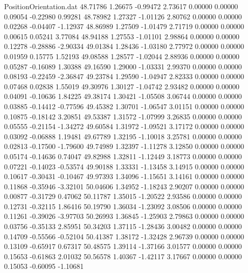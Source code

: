 \begin{filecontents}{PositionOrientation.dat}
  48.71786    1.26675   -0.99472     2.73617    0.00000    0.00000    0.09054   -0.22980    0.99281
  48.78982    1.27327   -1.01126     2.80762    0.00000    0.00000    0.02268   -0.04407   -1.12937
  48.86989    1.27509   -1.01479     2.71719    0.00000    0.00000    0.00615    0.05241    3.77084
  48.94188    1.27553   -1.01101     2.98864    0.00000    0.00000    0.12278   -0.28886   -2.90334
  49.01384    1.28436   -1.03180     2.77972    0.00000    0.00000    0.01959    0.15775    1.52193
  49.08588    1.28577   -1.02044     2.88936    0.00000    0.00000    0.05287   -0.16089    1.30388
  49.16590    1.29000   -1.03331     2.99370    0.00000    0.00000    0.08193   -0.22459   -2.36847
  49.23784    1.29590   -1.04947     2.82333    0.00000    0.00000    0.07468    0.02838    1.55019
  49.30976    1.30127   -1.04742     2.93482    0.00000    0.00000    0.04091   -0.10636    1.84225
  49.38174    1.30421   -1.05508     3.06744    0.00000    0.00000    0.03885   -0.14412   -0.77596
  49.45382    1.30701   -1.06547     3.01151    0.00000    0.00000    0.10875   -0.18142    3.20851
  49.53387    1.31572   -1.07999     3.26835    0.00000    0.00000    0.05555   -0.21154   -1.34272
  49.60584    1.31972   -1.09521     3.17172    0.00000    0.00000    0.03092   -0.06888    1.19481
  49.67789    1.32195   -1.10018     3.25781    0.00000    0.00000    0.02813   -0.17500   -1.79600
  49.74989    1.32397   -1.11278     3.12850    0.00000    0.00000    0.05174   -0.14636    0.74047
  49.82988    1.32811   -1.12449     3.18773    0.00000    0.00000    0.07221   -0.14023   -0.53574
  49.90188    1.33331   -1.13458     3.14915    0.00000    0.00000    0.10617   -0.30431   -0.10467
  49.97393    1.34096   -1.15651     3.14161    0.00000    0.00000    0.11868   -0.35946   -3.32101
  50.04606    1.34952   -1.18243     2.90207    0.00000    0.00000    0.00877   -0.31729    0.47062
  50.11787    1.35015   -1.20522     2.93586    0.00000    0.00000    0.12731   -0.32115    1.86416
  50.19790    1.36034   -1.23092     3.08506    0.00000    0.00000    0.11261   -0.39026   -3.97703
  50.26993    1.36845   -1.25903     2.79863    0.00000    0.00000    0.03756   -0.35133    2.85951
  50.34203    1.37115   -1.28436     3.00482    0.00000    0.00000    0.14709   -0.55566   -0.52104
  50.41387    1.38172   -1.32428     2.96739    0.00000    0.00000    0.13109   -0.65917    0.67317
  50.48575    1.39114   -1.37166     3.01577    0.00000    0.00000    0.15653   -0.61863    2.01032
  50.56578    1.40367   -1.42117     3.17667    0.00000    0.00000    0.15053   -0.60095   -1.10681

\end{filecontents}
